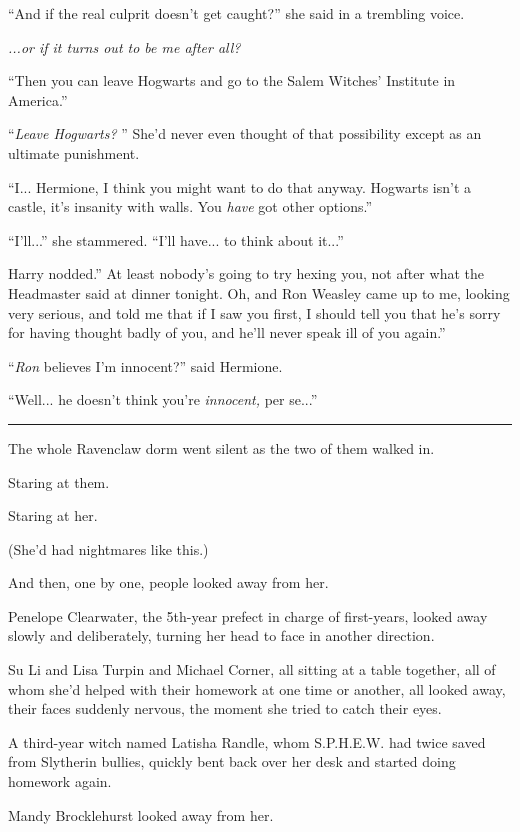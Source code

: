 ``And if the real culprit doesn't get caught?'' she said in a trembling
voice.

\emph{...or if it turns out to be me after all?}

``Then you can leave Hogwarts and go to the Salem Witches' Institute in
America.''

``\emph{Leave Hogwarts?} '' She'd never even thought of that possibility
except as an ultimate punishment.

``I... Hermione, I think you might want to do that anyway. Hogwarts
isn't a castle, it's insanity with walls. You \emph{have} got other
options.''

``I'll...'' she stammered. ``I'll have... to think about
it...''

Harry nodded.'' At least nobody's going to try hexing you, not after
what the Headmaster said at dinner tonight. Oh, and Ron Weasley came up
to me, looking very serious, and told me that if I saw you first, I
should tell you that he's sorry for having thought badly of you, and
he'll never speak ill of you again.''

``\emph{Ron} believes I'm innocent?'' said Hermione.

``Well... he doesn't think you're \emph{innocent,} per se...''

\begin{center}\rule{3in}{0.4pt}\end{center}

The whole Ravenclaw dorm went silent as the two of them walked in.

Staring at them.

Staring at her.

(She'd had nightmares like this.)

And then, one by one, people looked away from her.

Penelope Clearwater, the 5th-year prefect in charge of first-years,
looked away slowly and deliberately, turning her head to face in another
direction.

Su Li and Lisa Turpin and Michael Corner, all sitting at a table
together, all of whom she'd helped with their homework at one time or
another, all looked away, their faces suddenly nervous, the moment she
tried to catch their eyes.

A third-year witch named Latisha Randle, whom S.P.H.E.W. had twice saved
from Slytherin bullies, quickly bent back over her desk and started
doing homework again.

Mandy Brocklehurst looked away from her.

